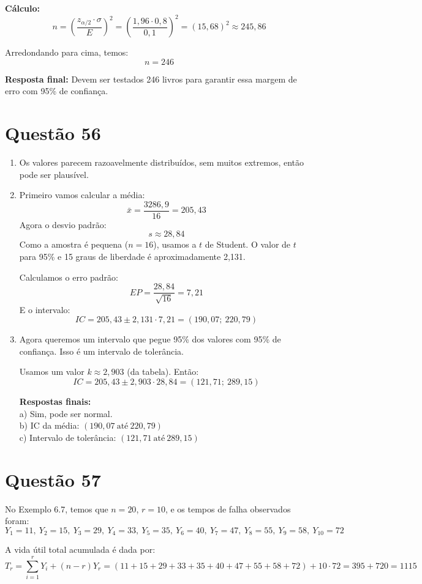 \documentclass[12pt]{article}
\newcommand{\quest}[1]{\section*{Questão #1}} %
\begin{document}
\textbf{Cálculo:}
\[
    n = \left( \frac{z_{\alpha/2} \cdot \sigma}{E} \right)^2 = \left( \frac{1{,}96 \cdot 0{,}8}{0{,}1} \right)^2 = (15{,}68)^2 \approx 245{,}86
\]

Arredondando para cima, temos:
\[
    \boxed{n = 246}
\]

\textbf{Resposta final:} Devem ser testados 246 livros para garantir essa margem de erro com 95\% de confiança.

\quest{56}

\begin{enumerate}
    \item Os valores parecem razoavelmente distribuídos, sem muitos extremos, então pode ser plausível.

    \item Primeiro vamos calcular a média:
    \[ 
    \bar{x} = \frac{3286{,}9}{16} = 205{,}43
    \]
    Agora o desvio padrão:
    \[ 
    s \approx 28{,}84
    \]
    Como a amostra é pequena ($n=16$), usamos a $t$ de Student. O valor de $t$ para 95\% e 15 graus de liberdade é aproximadamente 2{,}131.

    Calculamos o erro padrão:
    \[ 
    EP = \frac{28{,}84}{\sqrt{16}} = 7{,}21
    \]
    E o intervalo:
    \[ 
    IC = 205{,}43 \pm 2{,}131 \cdot 7{,}21 = (190{,}07;\ 220{,}79)
    \]

    \item Agora queremos um intervalo que pegue 95\% dos valores com 95\% de confiança. Isso é um intervalo de tolerância.

    Usamos um valor $k \approx 2{,}903$ (da tabela). Então:
    \[ 
    IC = 205{,}43 \pm 2{,}903 \cdot 28{,}84 = (121{,}71;\ 289{,}15)
    \]

    \textbf{Respostas finais:}\\
    a) Sim, pode ser normal.\\
    b) IC da média: $\boxed{(190{,}07\ \text{até}\ 220{,}79)}$\\
    c) Intervalo de tolerância: $\boxed{(121{,}71\ \text{até}\ 289{,}15)}$
\end{enumerate}

\quest{57}

No Exemplo 6.7, temos que \( n = 20 \), \( r = 10 \), e os tempos de falha observados foram:
\[
Y_1 = 11,\ Y_2 = 15,\ Y_3 = 29,\ Y_4 = 33,\ Y_5 = 35,\ Y_6 = 40,\ Y_7 = 47,\ Y_8 = 55,\ Y_9 = 58,\ Y_{10} = 72
\]

A vida útil total acumulada é dada por:
\[
T_r = \sum_{i=1}^{r} Y_i + (n - r)Y_r = (11 + 15 + 29 + 33 + 35 + 40 + 47 + 55 + 58 + 72) + 10 \cdot 72 = 395 + 720 = 1115
\]
\end{document}
